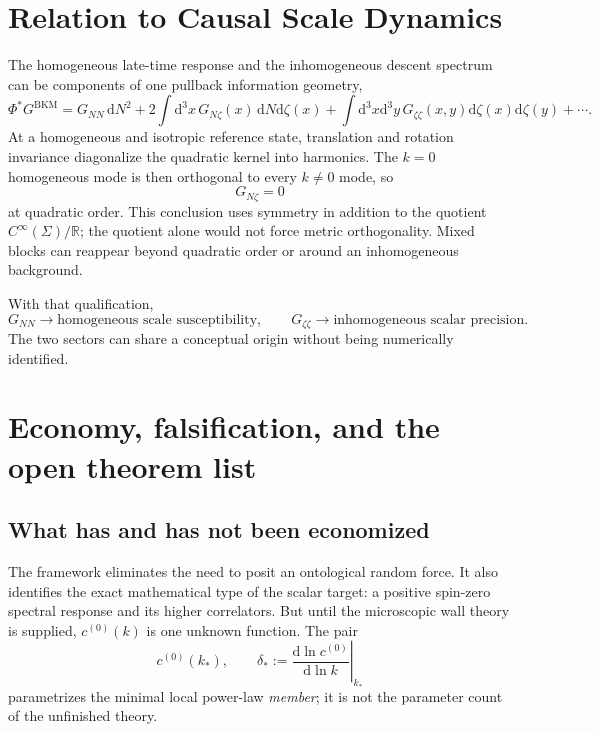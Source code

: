 \documentclass[11pt]{article}
\numberwithin{equation}{section}
\newcommand{\dd}{\mathrm d}
\newcommand{\BKM}{\mathrm{BKM}}
\newcommand{\cz}{c^{(0)}}
\theoremstyle{definition}
\theoremstyle{remark}
\begin{document}
\section{Relation to Causal Scale Dynamics}
\label{sec:CSD}

The homogeneous late-time response and the inhomogeneous descent spectrum can be components of one pullback information geometry,
\begin{equation}
\Phi^*G^{\BKM}
=G_{NN}\,\dd N^2
+2\int\dd^3x\,G_{N\zeta}(x)\,\dd N\dd\zeta(x)
+\int\dd^3x\dd^3y\,G_{\zeta\zeta}(x,y)\dd\zeta(x)\dd\zeta(y)
+\cdots.
\end{equation}
At a homogeneous and isotropic reference state, translation and rotation invariance diagonalize the quadratic kernel into harmonics. The $k=0$ homogeneous mode is then orthogonal to every $k\ne0$ mode, so
\begin{equation}
G_{N\zeta}=0
\end{equation}
at quadratic order. This conclusion uses symmetry in addition to the quotient $C^\infty(\Sigma)/\mathbb R$; the quotient alone would not force metric orthogonality. Mixed blocks can reappear beyond quadratic order or around an inhomogeneous background.

With that qualification,
\begin{equation}
G_{NN}\longrightarrow\text{homogeneous scale susceptibility},
\qquad
G_{\zeta\zeta}\longrightarrow\text{inhomogeneous scalar precision}.
\end{equation}
The two sectors can share a conceptual origin without being numerically identified.

\section{Economy, falsification, and the open theorem list}
\label{sec:ledger}

\subsection{What has and has not been economized}

The framework eliminates the need to posit an ontological random force. It also identifies the exact mathematical type of the scalar target: a positive spin-zero spectral response and its higher correlators. But until the microscopic wall theory is supplied, $\cz(k)$ is one unknown function. The pair
\begin{equation}
\cz(k_*),
\qquad
\delta_*:=\left.\frac{\dd\ln\cz}{\dd\ln k}\right|_{k_*}
\end{equation}
parametrizes the minimal local power-law \emph{member}; it is not the parameter count of the unfinished theory.
\end{document}
